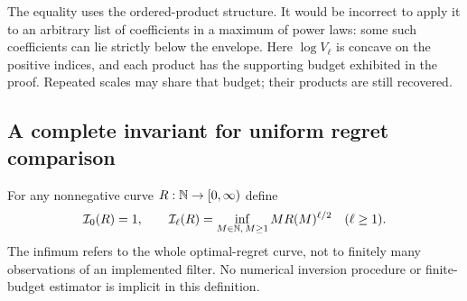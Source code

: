 \documentclass[11pt]{amsart}
\theoremstyle{definition}\newtheorem{definition}[theorem]{Definition}
\theoremstyle{remark}\newtheorem{remark}[theorem]{Remark}
\begin{document}
The equality uses the ordered-product structure. It would be incorrect
to apply it to an arbitrary list of coefficients in a maximum of power
laws: some such coefficients can lie strictly below the envelope. Here
$\log V_\ell$ is concave on the positive indices, and each product
has the supporting budget exhibited in the proof. Repeated scales may
share that budget; their products are still recovered.

\subsection{A complete invariant for uniform regret comparison}
For any nonnegative curve $R:\mathbb N\to[0,\infty)$ define
\begin{equation}\label{eq:operational-volume-transform}
 \mathcal I_0(R)=1,\qquad
 \mathcal I_\ell(R)=\inf_{M\in\mathbb N,\,M\ge1}
                       M R(M)^{\ell/2}\quad(\ell\ge1).
\end{equation}
The infimum refers to the whole optimal-regret curve, not to finitely
many observations of an implemented filter. No numerical inversion
procedure or finite-budget estimator is implicit in this definition.
\end{document}
